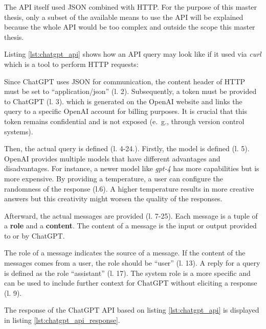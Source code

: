 The \ac{API} itself used JSON combined with \ac{HTTP}. For the purpose of this master thesis, only a subset of the available means to use the \ac{API} will be explained because the whole \ac{API} would be too complex and outside the scope this master thesis. 

Listing \ref{lst:chatgpt_api} shows how an \ac{API} query may look like if it used via \textit{curl} which is a tool to  perform \ac{HTTP} requests:

 \begin{figure} [htbp!]
 \centering
		\end{figure}
 

Since ChatGPT uses \ac{JSON} for communication, the content header of \ac{HTTP}  must be set to \enquote{application/json} (l. 2). Subsequently, a token must be provided to ChatGPT (l. 3). which is generated on the OpenAI website and links the query to a specific OpenAI account for billing purposes. It is crucial that this token remains confidential and is not exposed (e.~g., through version control systems).

Then, the actual query is defined (l. 4-24.). Firstly, the model is defined (l. 5). OpenAI provides multiple models that have different advantages and disadvantages. For instance, a newer model like \textit{gpt-4} has more capabilities but is more expensive.  By providing a temperature, a user can configure the randomness of the response (l.6). A higher temperature results in more creative answers but this creativity might worsen the quality of the responses. 

Afterward, the actual messages are provided (l. 7-25). Each message is a tuple of a \textbf{role} and a \textbf{content}. The content of a message is the input or output provided to or by ChatGPT. 

The role of a message indicates the source of a message. If the content of the messages comes from a user, the role should be \enquote{user} (l. 13). A reply for a query is defined as the role \enquote{assistant} (l. 17). The system role is a more specific and can be used to include further context for ChatGPT without eliciting a response (l. 9).

The response of the ChatGPT \ac{API} based on listing \ref{lst:chatgpt_api} is displayed in listing \ref{lst:chatgpt_api_response}.
 \begin{figure} [htbp!]
 \centering
		\end{figure}

